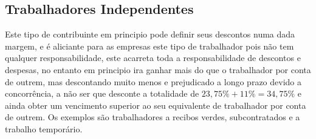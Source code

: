 \subsection{Trabalhadores Independentes}
\qquad Este tipo de contribuinte em principio pode definir seus descontos numa dada margem, e é aliciante para as empresas este tipo de trabalhador pois não tem qualquer responsabilidade, este acarreta toda a responsabilidade de descontos e despesas, no entanto em principio ira ganhar mais do que o trabalhador por conta de outrem, mas descontando muito menos e prejudicado a longo prazo devido a concorrência, a não ser que desconte a totalidade de $23,75\%+11\%=34,75\%$ e ainda obter um vencimento superior ao seu equivalente de trabalhador por conta de outrem.
Os exemplos são trabalhadores a recibos verdes, subcontratados e a trabalho temporário.
